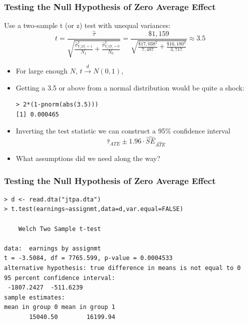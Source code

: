 \documentclass[xcolor=dvipsnames]{beamer}
\begin{document}
\begin{frame}[fragile]
\frametitle{Testing the Null Hypothesis of Zero Average Effect}
\small
{} Use a two-sample t (or z) test with unequal variances:\[
t=\frac{\widehat{\tau}}{\sqrt{\displaystyle\frac{\widehat{\sigma}_{Y_i|D_i=1}^2}{N_1} + \displaystyle\frac{\widehat{\sigma}_{Y_i|D_i=0}^2}{N_0}}}=\frac{\$1,159}{\sqrt{\displaystyle\frac{\$17,038^2}{7,487} + \displaystyle\frac{\$16,180^2}{3,717}}}\approx3.5
\]
\begin{itemize}
\footnotesize
\item For large enough $N$, $t \stackrel{d}{\rightarrow} N(0,1)$,
\item Getting a 3.5 or above from a normal distribution would be quite a shock:
\scriptsize
\begin{verbatim}
> 2*(1-pnorm(abs(3.5)))
[1] 0.000465
\end{verbatim}
\footnotesize
\item Inverting the test statistic we can construct a 95\% confidence interval
\[
\widehat{\tau}_{ATE}\pm 1.96 \cdot \widehat{ SE}_{\widehat{ATE}}
\]
\item What assumptions did we need along the way?
\end{itemize}
\end{frame}


\begin{frame}[fragile]
\frametitle{Testing the Null Hypothesis of Zero Average Effect}
{
\footnotesize
\begin{Verbatim}[frame=single, label=R Code, commandchars=\\\{\}]
> d <- read.dta("jtpa.dta")
> t.test(earnings~assignmt,data=d,var.equal=FALSE)

	Welch Two Sample t-test

data:  earnings by assignmt
t = -3.5084, df = 7765.599, p-value = 0.0004533
alternative hypothesis: true difference in means is not equal to 0
95 percent confidence interval:
 -1807.2427  -511.6239
sample estimates:
mean in group 0 mean in group 1
       15040.50        16199.94
\end{Verbatim}
}
\end{frame}
\end{document}
